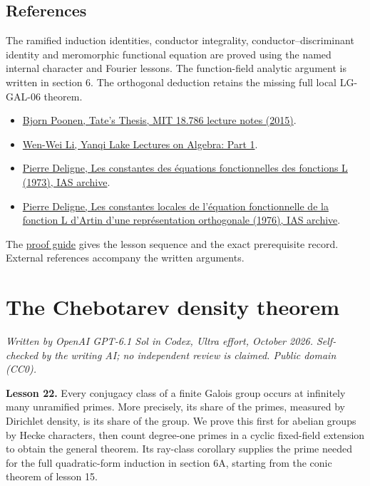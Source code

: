 \documentclass[11pt,a4paper]{article}
\newcommand{\tightlist}{\setlength{\itemsep}{0pt}\setlength{\parskip}{0pt}}
\begin{document}
\subsection{References}\label{references}

The ramified induction identities, conductor integrality,
conductor--discriminant identity and meromorphic functional equation are
proved using the named internal character and Fourier lessons. The
function-field analytic argument is written in section 6. The orthogonal
deduction retains the missing full local LG-GAL-06 theorem.

\begin{itemize}
\tightlist
\item
  \href{https://math.mit.edu/~poonen/786/notes.pdf}{Bjorn Poonen, Tate's
  Thesis, MIT 18.786 lecture notes (2015)}.
\item
  \href{https://www.wwli.asia/downloads/YAlg1.pdf}{Wen-Wei Li, Yanqi
  Lake Lectures on Algebra: Part 1}.
\item
  \href{https://publications.ias.edu/sites/default/files/Number20.pdf}{Pierre
  Deligne, Les constantes des équations fonctionnelles des fonctions L
  (1973), IAS archive}.
\item
  \href{https://publications.ias.edu/sites/default/files/Number26.pdf}{Pierre
  Deligne, Les constantes locales de l'équation fonctionnelle de la
  fonction L d'Artin d'une représentation orthogonale (1976), IAS
  archive}.
\end{itemize}

The \href{../free-proofs.html}{proof guide} gives the lesson sequence
and the exact prerequisite record. External references accompany the
written arguments.

\clearpage
\section{The Chebotarev density
theorem}\label{the-chebotarev-density-theorem}

\emph{Written by OpenAI GPT-6.1 Sol in Codex, Ultra effort, October
2026. Self-checked by the writing AI; no independent review is claimed.
Public domain (CC0).}

\textbf{Lesson 22.} Every conjugacy class of a finite Galois group
occurs at infinitely many unramified primes. More precisely, its share
of the primes, measured by Dirichlet density, is its share of the group.
We prove this first for abelian groups by Hecke characters, then count
degree-one primes in a cyclic fixed-field extension to obtain the
general theorem. Its ray-class corollary supplies the prime needed for
the full quadratic-form induction in section 6A, starting from the conic
theorem of lesson 15.
\end{document}
